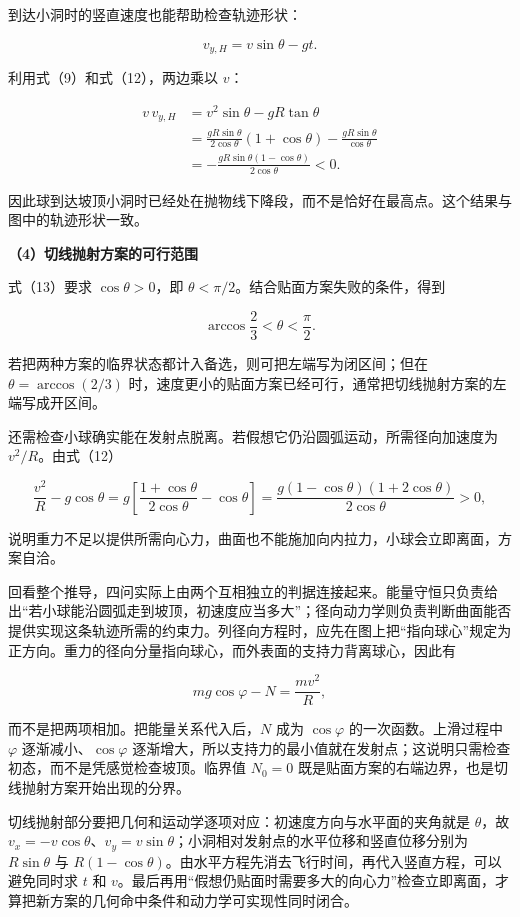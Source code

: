 \documentclass[12pt,a4paper,UTF8]{ctexart}
\begin{document}
到达小洞时的竖直速度也能帮助检查轨迹形状：

\[v_{y,H}=v\sin\theta-gt.\]

利用式（9）和式（12），两边乘以 \(v\)：

\[\begin{aligned}
v\,v_{y,H}
&=v^2\sin\theta-gR\tan\theta\\
&=\frac{gR\sin\theta}{2\cos\theta}
(1+\cos\theta)-\frac{gR\sin\theta}{\cos\theta}\\
&=-\frac{gR\sin\theta(1-\cos\theta)}{2\cos\theta}<0.
\end{aligned}\]

因此球到达坡顶小洞时已经处在抛物线下降段，而不是恰好在最高点。这个结果与图中的轨迹形状一致。

\textbf{（4）切线抛射方案的可行范围}

式（13）要求 \(\cos\theta>0\)，即
\(\theta<\pi/2\)。结合贴面方案失败的条件，得到

\[\boxed{\arccos\frac23<\theta<\frac\pi2}. \tag{14}\]

若把两种方案的临界状态都计入备选，则可把左端写为闭区间；但在
\(\theta=\arccos(2/3)\)
时，速度更小的贴面方案已经可行，通常把切线抛射方案的左端写成开区间。

还需检查小球确实能在发射点脱离。若假想它仍沿圆弧运动，所需径向加速度为
\(v^2/R\)。由式（12）

\[\frac{v^2}{R}-g\cos\theta
=g\left[\frac{1+\cos\theta}{2\cos\theta}-\cos\theta\right]
=\frac{g(1-\cos\theta)(1+2\cos\theta)}{2\cos\theta}>0,\]

说明重力不足以提供所需向心力，曲面也不能施加向内拉力，小球会立即离面，方案自洽。

回看整个推导，四问实际上由两个互相独立的判据连接起来。能量守恒只负责给出``若小球能沿圆弧走到坡顶，初速度应当多大''；径向动力学则负责判断曲面能否提供实现这条轨迹所需的约束力。列径向方程时，应先在图上把``指向球心''规定为正方向。重力的径向分量指向球心，而外表面的支持力背离球心，因此有

\[mg\cos\varphi-N=\frac{mv^2}{R},\]

而不是把两项相加。把能量关系代入后，\(N\) 成为 \(\cos\varphi\)
的一次函数。上滑过程中 \(\varphi\) 逐渐减小、\(\cos\varphi\)
逐渐增大，所以支持力的最小值就在发射点；这说明只需检查初态，而不是凭感觉检查坡顶。临界值
\(N_0=0\) 既是贴面方案的右端边界，也是切线抛射方案开始出现的分界。

切线抛射部分要把几何和运动学逐项对应：初速度方向与水平面的夹角就是
\(\theta\)，故
\(v_x=-v\cos\theta\)、\(v_y=v\sin\theta\)；小洞相对发射点的水平位移和竖直位移分别为
\(R\sin\theta\) 与
\(R(1-\cos\theta)\)。由水平方程先消去飞行时间，再代入竖直方程，可以避免同时求
\(t\) 和
\(v\)。最后再用``假想仍贴面时需要多大的向心力''检查立即离面，才算把新方案的几何命中条件和动力学可实现性同时闭合。
\end{document}
